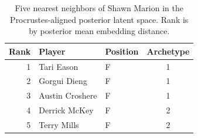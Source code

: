 \begin{table}[htbp]
  \centering\small
  \begin{tabular}{rllc}
    \toprule
    Rank & Player & Position & Archetype \\
    \midrule
    1 & Tari Eason & F & 1 \\
    2 & Gorgui Dieng & F & 1 \\
    3 & Austin Croshere & F & 1 \\
    4 & Derrick McKey & F & 2 \\
    5 & Terry Mills & F & 2 \\
    \bottomrule
  \end{tabular}
  \caption{Five nearest neighbors of Shawn Marion in the Procrustes-aligned posterior latent space. Rank is by posterior mean embedding distance.}
  \label{tab:Shawn_Marion_neighbors}
\end{table}

